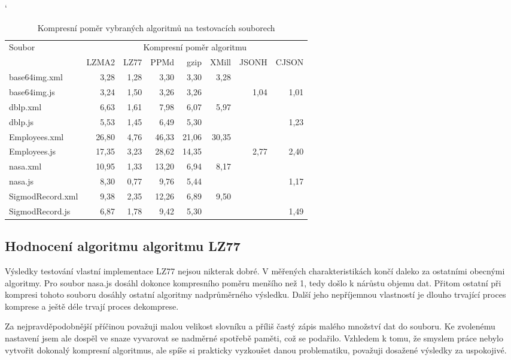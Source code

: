 \begin{table}[!h]
\catcode`
\centering
\begin{tabular}{|l|r|r|r|r|r|r|r|}
\hline
 \multirow{2}{*}{Soubor} & \multicolumn{7}{|c|}{Kompresní poměr algoritmu}\\
 \cline{2-8}
 & LZMA2 & LZ77 & PPMd & gzip & XMill & JSONH & CJSON\\
 \hline
 base64img.xml & 3,28 & 1,28 & 3,30 & 3,30 & 3,28 & & \\
 base64img.js & 3,24 & 1,50 & 3,26 & 3,26 & & 1,04 & 1,01\\
 \hline
 dblp.xml & 6,63 & 1,61 & 7,98 & 6,07 & 5,97 & & \\
 dblp.js & 5,53 & 1,45 & 6,49 & 5,30 & & & 1,23\\
 \hline
 Employees.xml & 26,80 & 4,76 & 46,33 & 21,06 & 30,35 & & \\
 Employees.js & 17,35 & 3,23 & 28,62 & 14,35 & & 2,77 & 2,40\\
 \hline
 nasa.xml & 10,95 & 1,33 & 13,20 & 6,94 & 8,17 & & \\
 nasa.js & 8,30 & 0,77 & 9,76 & 5,44 & & & 1,17\\
 \hline
 SigmodRecord.xml & 9,38 & 2,35 & 12,26 & 6,89 & 9,50 & & \\
 SigmodRecord.js & 6,87 & 1,78 & 9,42 & 5,30 & & & 1,49\\
\hline
\end{tabular}
\caption{Kompresní poměr vybraných algoritmů na testovacích souborech}
\label{tabulkaKompresniPomer}
\end{table}

\subsection{Hodnocení algoritmu algoritmu LZ77}
Výsledky testování vlastní implementace LZ77 nejsou nikterak dobré. V měřených charakteristikách končí daleko za ostatními obecnými algoritmy. Pro soubor nasa.js dosáhl dokonce kompresního poměru menšího než 1, tedy došlo k nárůstu objemu dat. Přitom ostatní při kompresi tohoto souboru dosáhly ostatní algoritmy nadprůměrného výsledku. Další jeho nepříjemnou vlastností je dlouho trvající proces komprese a ještě déle trvají proces dekomprese.

Za nejpravděpodobnější příčinou považuji malou velikost slovníku a příliš častý zápis malého množství dat do souboru. Ke zvolenému nastavení jsem ale dospěl ve snaze vyvarovat se nadměrné spotřebě paměti, což se podařilo. Vzhledem k tomu, že smyslem práce nebylo vytvořit dokonalý kompresní algoritmus, ale spíše si prakticky vyzkoušet danou problematiku, považuji dosažené výsledky za uspokojivé.

